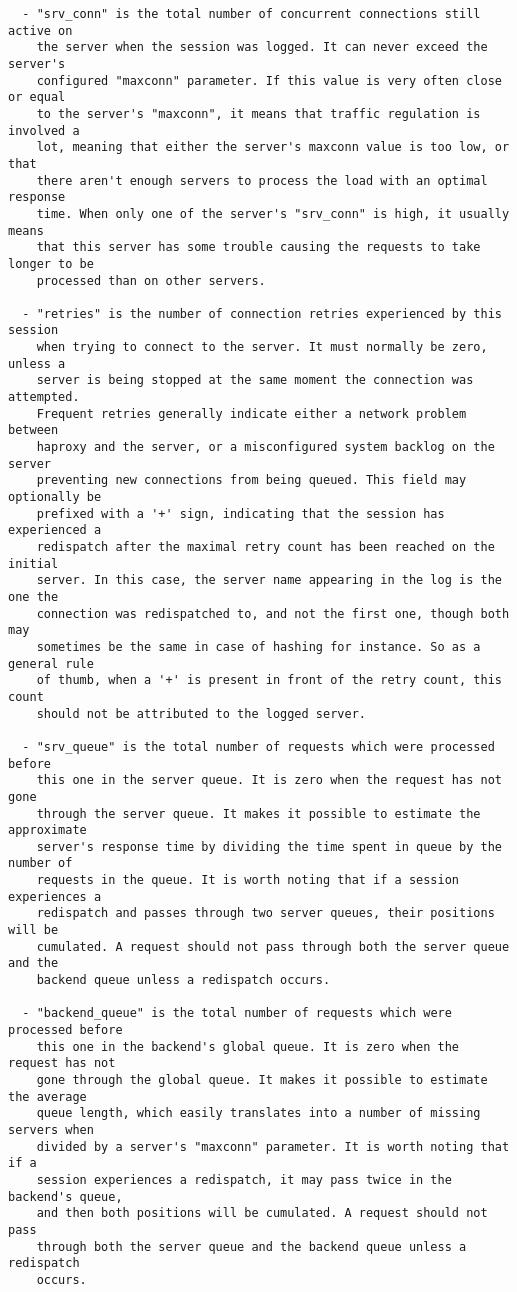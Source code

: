 \begin{verbatim}
  - "srv_conn" is the total number of concurrent connections still active on
    the server when the session was logged. It can never exceed the server's
    configured "maxconn" parameter. If this value is very often close or equal
    to the server's "maxconn", it means that traffic regulation is involved a
    lot, meaning that either the server's maxconn value is too low, or that
    there aren't enough servers to process the load with an optimal response
    time. When only one of the server's "srv_conn" is high, it usually means
    that this server has some trouble causing the requests to take longer to be
    processed than on other servers.

  - "retries" is the number of connection retries experienced by this session
    when trying to connect to the server. It must normally be zero, unless a
    server is being stopped at the same moment the connection was attempted.
    Frequent retries generally indicate either a network problem between
    haproxy and the server, or a misconfigured system backlog on the server
    preventing new connections from being queued. This field may optionally be
    prefixed with a '+' sign, indicating that the session has experienced a
    redispatch after the maximal retry count has been reached on the initial
    server. In this case, the server name appearing in the log is the one the
    connection was redispatched to, and not the first one, though both may
    sometimes be the same in case of hashing for instance. So as a general rule
    of thumb, when a '+' is present in front of the retry count, this count
    should not be attributed to the logged server.

  - "srv_queue" is the total number of requests which were processed before
    this one in the server queue. It is zero when the request has not gone
    through the server queue. It makes it possible to estimate the approximate
    server's response time by dividing the time spent in queue by the number of
    requests in the queue. It is worth noting that if a session experiences a
    redispatch and passes through two server queues, their positions will be
    cumulated. A request should not pass through both the server queue and the
    backend queue unless a redispatch occurs.

  - "backend_queue" is the total number of requests which were processed before
    this one in the backend's global queue. It is zero when the request has not
    gone through the global queue. It makes it possible to estimate the average
    queue length, which easily translates into a number of missing servers when
    divided by a server's "maxconn" parameter. It is worth noting that if a
    session experiences a redispatch, it may pass twice in the backend's queue,
    and then both positions will be cumulated. A request should not pass
    through both the server queue and the backend queue unless a redispatch
    occurs.


\end{verbatim}
